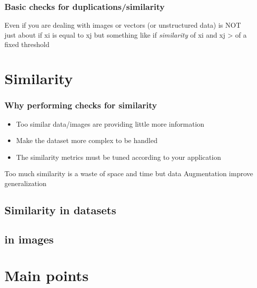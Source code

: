 \subsubsection{Basic checks for duplications/similarity}
\noindent Even if you are dealing with images or vectors (or unstructured data) is NOT just about if xi is equal to xj but something like if \textit{similarity} of xi and xj > of a fixed threshold


\section{Similarity }

\subsubsection{Why performing checks for similarity}
\begin{itemize}
    \item Too similar data/images are providing little more information
    \item Make the dataset more complex to be handled
    \item The similarity metrics must be tuned according to your application
\end{itemize}

\noindent Too much similarity is a waste of space and time but data Augmentation improve generalization 

\subsection{Similarity in datasets}




\subsection{in images}

\section{Main points}